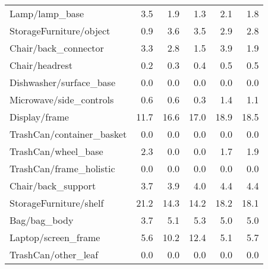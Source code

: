 \begin{table}[!h]
\begin{tabular}{lrrrrr}
Lamp/lamp\_base                 &            3.5 &             1.9 &                     1.3 &           2.1 &                   1.8 \\
StorageFurniture/object        &            0.9 &             3.6 &                     3.5 &           2.9 &                   2.8 \\
Chair/back\_connector           &            3.3 &             2.8 &                     1.5 &           3.9 &                   1.9 \\
Chair/headrest                 &            0.2 &             0.3 &                     0.4 &           0.5 &                   0.5 \\
Dishwasher/surface\_base        &            0.0 &             0.0 &                     0.0 &           0.0 &                   0.0 \\
Microwave/side\_controls        &            0.6 &             0.6 &                     0.3 &           1.4 &                   1.1 \\
Display/frame                  &           11.7 &            16.6 &                    17.0 &          18.9 &                  18.5 \\
TrashCan/container\_basket      &            0.0 &             0.0 &                     0.0 &           0.0 &                   0.0 \\
TrashCan/wheel\_base            &            2.3 &             0.0 &                     0.0 &           1.7 &                   1.9 \\
TrashCan/frame\_holistic        &            0.0 &             0.0 &                     0.0 &           0.0 &                   0.0 \\
Chair/back\_support             &            3.7 &             3.9 &                     4.0 &           4.4 &                   4.4 \\
StorageFurniture/shelf         &           21.2 &            14.3 &                    14.2 &          18.2 &                  18.1 \\
Bag/bag\_body                   &            3.7 &             5.1 &                     5.3 &           5.0 &                   5.0 \\
Laptop/screen\_frame            &            5.6 &            10.2 &                    12.4 &           5.1 &                   5.7 \\
TrashCan/other\_leaf            &            0.0 &             0.0 &                     0.0 &           0.0 &                   0.0 \\

\end{tabular}
\end{table}
